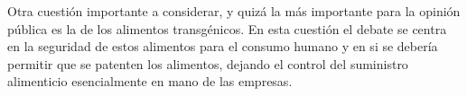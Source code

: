 \documentclass[fleqn,10pt]{SelfArx} %
\begin{document}
Otra cuestión importante a considerar, y quizá la más importante para la opinión pública es la de los alimentos transgénicos. En esta cuestión el debate se centra en la seguridad de estos alimentos para el consumo humano y en si se debería permitir que se patenten los alimentos, dejando el control del suministro alimenticio esencialmente en mano de las empresas\cite{berkowitz1994transgenic, Jefferson, ledford2013transgenic}.






\end{document}
